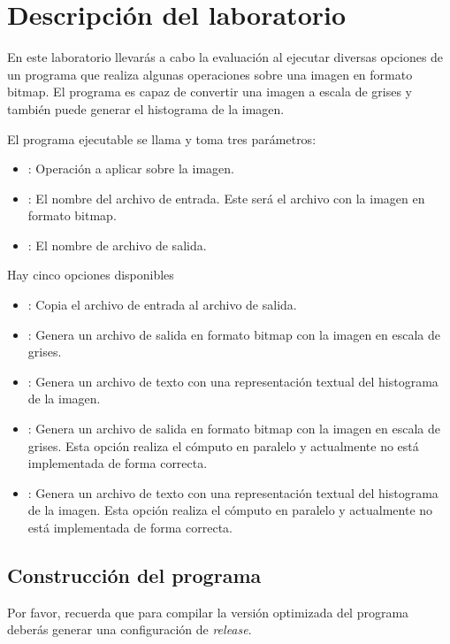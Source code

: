 \section{Descripción del laboratorio}

En este laboratorio llevarás a cabo la evaluación al ejecutar diversas opciones
de un programa que realiza algunas operaciones sobre una imagen en formato bitmap.
El programa es capaz de convertir una imagen a escala de grises y también puede 
generar el histograma de la imagen.

El programa ejecutable se llama  y toma tres parámetros:
\begin{itemize}
\item {}: Operación a aplicar sobre la imagen.
\item {}: El nombre del archivo de entrada. Este será el archivo con la imagen en formato bitmap.
\item {}: El nombre de archivo de salida.
\end{itemize}

Hay cinco opciones disponibles

\begin{itemize}
\item {}: Copia el archivo de entrada al archivo de salida.
\item {}: Genera un archivo de salida en formato bitmap con la imagen en escala de grises.
\item {}: Genera un archivo de texto con una representación textual del histograma de la imagen.
\item {}: Genera un archivo de salida en formato bitmap con la imagen en escala de grises.
Esta opción realiza el cómputo en paralelo y actualmente no está implementada de forma correcta.
\item {}: Genera un archivo de texto con una representación textual del histograma de la imagen.
Esta opción realiza el cómputo en paralelo y actualmente no está implementada de forma correcta.
\end{itemize}

\subsection{Construcción del programa}

Por favor, recuerda que para compilar la versión optimizada del programa 
deberás generar una configuración de \emph{release}.

